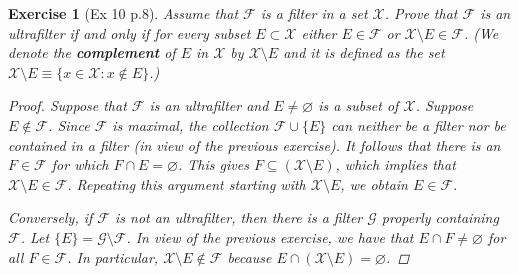 \documentclass[11pt]{article}
\newtheorem{exercise}{Exercise}
\begin{document}
\begin{exercise}[Ex 10 p.8]
	Assume that $\mathcal{F}$ is a filter in a set $\mathcal{X}$. Prove that $\mathcal{F}$ is an ultrafilter if and only if for every subset $E \subset \mathcal{X}$ either $E \in \mathcal{F}$ or $\mathcal{X} \setminus E \in \mathcal{F}$. (We denote the \textbf{complement} of $E$ in $\mathcal{X}$ by $\mathcal{X}\setminus E$ and it is defined as the set $\mathcal{X}\setminus E \equiv \{  x\in \mathcal{X} : x\notin E \}$.)
	\begin{proof}
		Suppose that $\mathcal{F}$ is an ultrafilter and $E \neq \varnothing$ is a subset of $\mathcal{X}$. Suppose $E \notin \mathcal{F}$. Since $\mathcal{F}$ is maximal, the collection $\mathcal{F} \cup \{ E \}$ can neither be a filter nor be contained in a filter (in view of the previous exercise). It follows that there is an $F\in \mathcal{F}$ for which $F \cap E  = \varnothing$. This gives $F \subseteq (\mathcal{X}\setminus E)$, which implies that $\mathcal{X} \setminus E \in \mathcal{F}$. Repeating this argument starting with $\mathcal{X}\setminus E$, we obtain $E\in \mathcal{F}$. 
		
		Conversely, if $\mathcal{F}$ is not an ultrafilter, then there is a filter $\mathcal{G}$ properly containing $\mathcal{F}$. Let $\{E \} = \mathcal{G}\setminus \mathcal{F}$. In view of the previous exercise, we have that $E\cap F \neq \varnothing$ for all $F\in \mathcal{F}$. In particular, $\mathcal{X} \setminus E \notin \mathcal{F}$ because $E \cap (\mathcal{X}\setminus E) = \varnothing$. 
	\end{proof}
\end{exercise}
\end{document}
